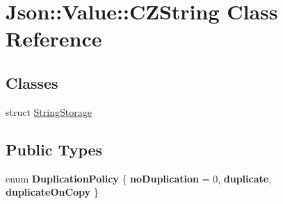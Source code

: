 \hypertarget{class_json_1_1_value_1_1_c_z_string}{}\section{Json\+:\+:Value\+:\+:C\+Z\+String Class Reference}
\label{class_json_1_1_value_1_1_c_z_string}
\subsection*{Classes}
\begin{DoxyCompactItemize}
\item 
struct \hyperlink{struct_json_1_1_value_1_1_c_z_string_1_1_string_storage}{String\+Storage}
\end{DoxyCompactItemize}
\subsection*{Public Types}
\begin{DoxyCompactItemize}
\item 
\hypertarget{class_json_1_1_value_1_1_c_z_string_a2805c46fb4a72bbaed55de6d75941b6d}{}enum {\bfseries Duplication\+Policy} \{ {\bfseries no\+Duplication} = 0, 
{\bfseries duplicate}, 
{\bfseries duplicate\+On\+Copy}
 \}\label{class_json_1_1_value_1_1_c_z_string_a2805c46fb4a72bbaed55de6d75941b6d}

\end{DoxyCompactItemize}
